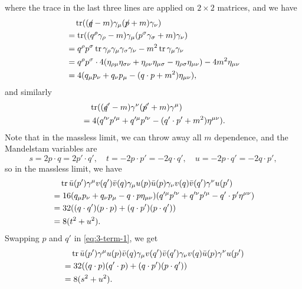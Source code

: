 \documentclass[hyperref, a4paper]{article}
\newcommand{\fsl}[1]{{\centernot{#1}}}
\begin{document}
where the trace in the last three lines are applied on $2\times 2$ matrices, and we have
\[
    \begin{aligned}
        &\quad \trace ( (\fsl{q} - m) \gamma_\mu (\fsl{p} + m) \gamma_\nu ) \\
        &= \trace( (q^\rho \gamma_\rho - m) \gamma_\mu (p^\sigma \gamma_\sigma + m) \gamma_\nu ) \\
        &= q^\rho p^\sigma \trace \gamma_\rho \gamma_\mu \gamma_\sigma \gamma_\nu - m^2 \trace \gamma_\mu \gamma_\nu \\
        &= q^\rho p^\sigma \cdot 4 (\eta_{\rho \mu} \eta_{\sigma \nu} + \eta_{\rho \nu} \eta_{\mu \sigma} - \eta_{\rho \sigma} \eta_{\mu \nu}) - 4 m^2 \eta_{\mu \nu} \\
        &= 4 (q_\mu p_\nu + q_\nu p_\mu - (q \cdot p + m^2) \eta_{\mu \nu}),
    \end{aligned}
\]
and similarly 
\[
    \begin{aligned}
        &\quad \trace( (\fsl{q}' - m) \gamma^\nu (\fsl{p}' + m) \gamma^\mu ) \\
        &= 4 (q'^\nu p'^\mu + q'^\mu p'^\nu - (q' \cdot p' + m^2) \eta^{\mu \nu}).
    \end{aligned}
\]
Note that in the massless limit, we can throw away all $m$ dependence, and the Mandelstam variables are 
\begin{equation}
    s = 2 p \cdot q = 2 p' \cdot q', \quad t = - 2 p \cdot p' = - 2 q \cdot q', \quad u = - 2 p \cdot q' = - 2 q \cdot p',
\end{equation}
so in the massless limit, we have 
\begin{equation}
    \begin{aligned}
        &\quad \trace \bar{u}(p') \gamma^\mu v(q') \bar{v}(q) \gamma_\mu u(p) \bar{u}(p) \gamma_\nu v(q) \bar{v}(q') \gamma^\nu u(p') \\
        &= 16 (q_\mu p_\nu + q_\nu p_\mu - q \cdot p  \eta_{\mu \nu}) (q'^\mu p'^\nu + q'^\nu p'^\mu - q' \cdot p' \eta^{\mu \nu}) \\
        &= 32 ( (q \cdot q') (p \cdot p) + (q \cdot p') (p \cdot q') ) \\
        &= 8 (t^2 + u^2).
    \end{aligned}
    \label{eq:3-term-1}
\end{equation}
Swapping $p$ and $q'$ in \eqref{eq:3-term-1}, we get 
\begin{equation}
    \begin{aligned}
        &\quad \trace \bar{u}(p') \gamma^\mu u(p) \bar{v}(q) \gamma_\mu v(q') \bar{v}(q') \gamma_\nu v(q) \bar{u}(p) \gamma^\nu u(p') \\
        &= 32 ( (q \cdot p) (q' \cdot p) + (q \cdot p') (p \cdot q') ) \\
        &= 8(s^2 + u^2).
    \end{aligned}
    \label{eq:3-term-2}
\end{equation}
\end{document}

